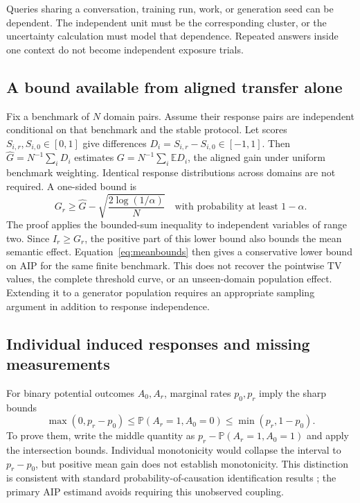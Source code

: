 \documentclass[11pt,letterpaper]{article}
\theoremstyle{definition}\newtheorem{definition}[theorem]{Definition}
\newcommand{\E}{\mathbb{E}}
\newcommand{\Prob}{\mathbb{P}}
\begin{document}
Queries sharing a conversation, training run, work, or generation seed can be dependent. The independent unit must be the corresponding cluster, or the uncertainty calculation must model that dependence. Repeated answers inside one context do not become independent exposure trials.

\subsection{A bound available from aligned transfer alone}
Fix a benchmark of $N$ domain pairs. Assume their response pairs are independent conditional on that benchmark and the stable protocol. Let scores $S_{i,r},S_{i,0}\in[0,1]$ give differences $D_i=S_{i,r}-S_{i,0}\in[-1,1]$. Then $\widehat G=N^{-1}\sum_iD_i$ estimates $G=N^{-1}\sum_i\E D_i$, the aligned gain under uniform benchmark weighting. Identical response distributions across domains are not required. A one-sided bound is
\begin{equation}
G_r\ge \widehat G-\sqrt{\frac{2\log(1/\alpha)}{N}}
\quad\text{with probability at least }1-\alpha.
\label{eq:gainci}
\end{equation}
The proof applies the bounded-sum inequality to independent variables of range two. Since $I_r\ge G_r$, the positive part of this lower bound also bounds the mean semantic effect. Equation~\eqref{eq:meanbounds} then gives a conservative lower bound on AIP for the same finite benchmark. This does not recover the pointwise TV values, the complete threshold curve, or an unseen-domain population effect. Extending it to a generator population requires an appropriate sampling argument in addition to response independence.

\subsection{Individual induced responses and missing measurements}
For binary potential outcomes $A_0,A_r$, marginal rates $p_0,p_r$ imply the sharp bounds
\begin{equation}
\max(0,p_r-p_0)\le\Prob(A_r=1,A_0=0)\le\min(p_r,1-p_0).
\label{eq:pns}
\end{equation}
To prove them, write the middle quantity as $p_r-\Prob(A_r=1,A_0=1)$ and apply the intersection bounds. Individual monotonicity would collapse the interval to $p_r-p_0$, but positive mean gain does not establish monotonicity. This distinction is consistent with standard probability-of-causation identification results \cite{tianpearl2000}; the primary AIP estimand avoids requiring this unobserved coupling.
\end{document}
